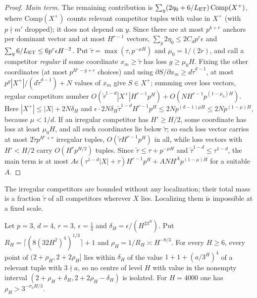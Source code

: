 \documentclass[11pt]{article}
\begin{document}
\begin{proof}
\emph{Main term.} The remaining contribution is
$\sum_y(2\eta_0+6/L_{\rm ET})\,\mathrm{Comp}(X^+)$, where $\mathrm{Comp}(X^+)$ counts relevant competitor
tuples with value in $X^+$ (with $p\nmid m'$ dropped); it does not depend on $y$. Since there are at most
$p^{k+r}$ anchors per dominant vector and at most $H^{r-1}$ vectors,
$\sum_y2\eta_0\le2C_dp^r\epsilon$ and $\sum_y6/L_{\rm ET}\le6p^r\epsilon H^{-2}$. Put
$\tilde\tau=\max(\tau,p^{-\mu H})$ and $\mu_0=1/(2r)$, and call a competitor \emph{regular} if some
coordinate $x_m\ge\tilde\tau$ has loss $g\ge\mu_0H$. Fixing the other coordinates (at most $p^{H'-g+r}$
choices) and using $\partial S/\partial x_m\ge d\tilde\tau^{d-1}$, at most $p^g|X^+|/(d\tilde\tau^{d-1})+N$
values of $x_m$ give $S\in X^+$; summing over loss vectors, regular competitors number
$O(\tilde\tau^{1-d}|X^+|H^{r-1}p^H)+O(NH^{r-1}p^{(1-\mu_0)H})$. Here $|X^+|\le|X|+2N\delta_H$ and
$\epsilon\cdot2N\delta_H\tilde\tau^{1-d}H^{r-1}p^H\le2Np^{(d-1)\mu H}\le2Np^{(1-\mu)H}$, because $\mu<1/d$. If an
irregular competitor has $H'\ge H/2$, some coordinate has loss at least $\mu_0H$, and all such
coordinates lie below $\tilde\tau$; so each loss vector carries at most $2\tilde\tau p^{H'+r}$ irregular
tuples, $O(\tilde\tau H^{r-1}p^H)$ in all, while loss vectors with $H'<H/2$ carry $O(H^rp^{H/2})$ tuples.
Since $\tilde\tau\le\tau+p^{-\mu H}$ and $\tilde\tau^{1-d}\le\tau^{1-d}$, the main term is at most
$A\epsilon(\tau^{1-d}|X|+\tau)H^{r-1}p^H+ANH^Ap^{(1-\mu)H}$ for a suitable $A$.
\end{proof}

The irregular competitors are bounded without any localization; their total mass is a fraction
$\tilde\tau$ of all competitors wherever $X$ lies. Localizing them is impossible at a fixed scale.

\begin{proposition}\label{prop:nouniform}
Let $p=3$, $d=4$, $r=3$, $\epsilon=\frac14$ and $\delta_H=\epsilon/(H^23^H)$. Put
$R_H=\lceil(8(32H^2)^4)^{1/3}\rceil+1$ and $\rho_H=1/R_H\asymp H^{-8/3}$. For every $H\ge6$, every point of
$(2+\rho_H,2+2\rho_H]$ lies within $\delta_H$ of the value $1+1+(a/3^H)^4$ of a relevant tuple with
$3\nmid a$, so no centre of level $H$ with value in the nonempty interval
$(2+\rho_H+\delta_H,2+2\rho_H-\delta_H)$ is isolated. For $H=4000$ one has $\rho_H>3^{-\sigma_3H/3}$.
\end{proposition}
\end{document}
